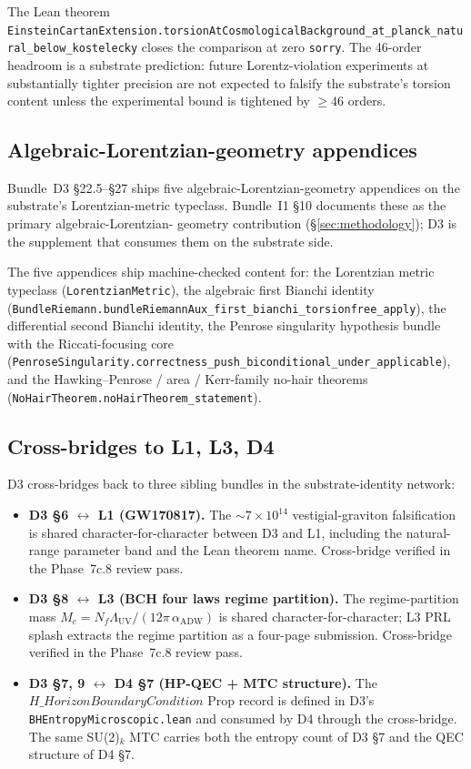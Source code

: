 \documentclass[aps,prd,reprint,nofootinbib,superscriptaddress]{revtex4-2}
\begin{document}
The Lean theorem
\texttt{EinsteinCartanExtension.torsionAtCosmologicalBackground\_at\_planck\_natural\_below\_kostelecky}
closes the comparison at zero \texttt{sorry}. The 46-order headroom
is a substrate prediction: future Lorentz-violation experiments at
substantially tighter precision are not expected to falsify the
substrate's torsion content unless the experimental bound is
tightened by $\geq 46$ orders.

\subsection{Algebraic-Lorentzian-geometry appendices}

Bundle~D3 \S 22.5--\S 27 ships five algebraic-Lorentzian-geometry
appendices on the substrate's Lorentzian-metric typeclass.
Bundle~I1 \S 10 documents these as the primary algebraic-Lorentzian-
geometry contribution (\S\ref{sec:methodology}); D3 is the supplement
that consumes them on the substrate side.

The five appendices ship machine-checked content for: the Lorentzian
metric typeclass (\texttt{LorentzianMetric}), the algebraic first
Bianchi identity
(\texttt{BundleRiemann.bundleRiemannAux\_first\_bianchi\_torsionfree\_apply}),
the differential second Bianchi identity, the Penrose singularity
hypothesis bundle with the Riccati-focusing core
(\texttt{PenroseSingularity.correctness\_push\_biconditional\_under\_applicable}),
and the Hawking--Penrose / area / Kerr-family no-hair theorems
(\texttt{NoHairTheorem.noHairTheorem\_statement}).

\subsection{Cross-bridges to L1, L3, D4}

D3 cross-bridges back to three sibling bundles in the substrate-identity
network:

\begin{itemize}
\item \textbf{D3 \S 6 $\leftrightarrow$ L1 (GW170817).} The
  $\sim 7\times 10^{14}$ vestigial-graviton falsification is shared
  character-for-character between D3 and L1, including the natural-range
  parameter band and the Lean theorem name. Cross-bridge verified
  in the Phase~7c.8 review pass.
\item \textbf{D3 \S 8 $\leftrightarrow$ L3 (BCH four laws regime
  partition).} The regime-partition mass $M_c = N_f \Lambda_{\mathrm{UV}}/
  (12\pi\,\alpha_{\mathrm{ADW}})$ is shared character-for-character;
  L3 PRL splash extracts the regime partition as a four-page
  submission. Cross-bridge verified in the Phase~7c.8 review pass.
\item \textbf{D3 \S 7, 9 $\leftrightarrow$ D4 \S 7 (HP-QEC + MTC
  structure).} The $H\_HorizonBoundaryCondition$ Prop record is
  defined in D3's \texttt{BHEntropyMicroscopic.lean} and consumed
  by D4 through the cross-bridge. The same SU(2)$_k$ MTC carries
  both the entropy count of D3 \S 7 and the QEC structure of D4
  \S 7.
\end{itemize}
\end{document}

